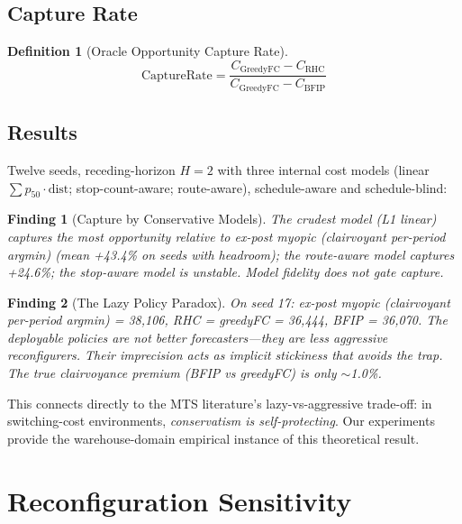 \documentclass[11pt,a4paper]{article}
\newtheorem{definition}{Definition}
\newtheorem{finding}{Finding}
\begin{document}
\subsection{Capture Rate}

\begin{definition}[Oracle Opportunity Capture Rate]
\begin{equation}
\text{CaptureRate} = \frac{C_{\text{GreedyFC}} - C_{\text{RHC}}}
{C_{\text{GreedyFC}} - C_{\text{BFIP}}}
\end{equation}
\end{definition}

\subsection{Results}

Twelve seeds, receding-horizon $H=2$ with three internal cost models
(linear $\sum p_{50} \cdot \text{dist}$; stop-count-aware; route-aware),
schedule-aware and schedule-blind:

\begin{finding}[Capture by Conservative Models]
The crudest model (L1 linear) captures the most opportunity relative to
ex-post myopic (clairvoyant per-period argmin) (mean +43.4\% on seeds with headroom); the route-aware
model captures +24.6\%; the stop-aware model is unstable. \emph{Model
fidelity does not gate capture.}
\end{finding}

\begin{finding}[The Lazy Policy Paradox]
On seed 17: ex-post myopic (clairvoyant per-period argmin) = 38{,}106, RHC = greedyFC = 36{,}444, BFIP =
36{,}070. The deployable policies are \emph{not better forecasters}---they
are \emph{less aggressive reconfigurers}. Their imprecision acts as
implicit stickiness that avoids the trap. The true clairvoyance premium
(BFIP vs greedyFC) is only $\sim$1.0\%.
\end{finding}

This connects directly to the MTS literature's lazy-vs-aggressive
trade-off: in switching-cost environments, \emph{conservatism is
self-protecting}. Our experiments provide the warehouse-domain empirical
instance of this theoretical result.

\section{Reconfiguration Sensitivity}\label{sec:sensitivity}
\end{document}
